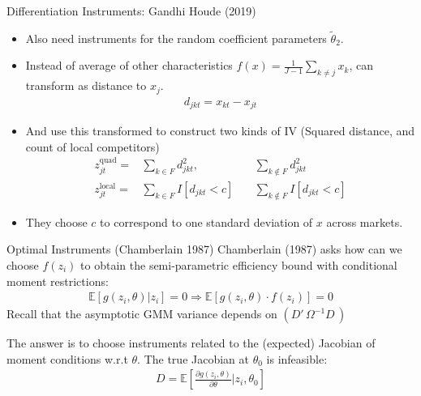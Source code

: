 \documentclass[xcolor=pdftex,dvipsnames,table,mathserif,aspectratio=169]{beamer}
\begin{document}
\begin{frame}{Differentiation Instruments: Gandhi Houde (2019)}
\small
\begin{itemize}
\item Also need instruments for the random coefficient parameters $\widetilde{\theta}_2$.
\item Instead of average of other characteristics $f(x) = \frac{1}{J-1} \sum_{k \neq j} x_k$, can transform as distance to $x_j$.
\begin{eqnarray*}
d_{jkt} =  x_{kt} - x_{jt}  
\end{eqnarray*}
\item And use this transformed to construct two kinds of IV (Squared distance, and count of local competitors)
\begin{eqnarray*}
z_{jt}^{\text{quad}} =& \sum_{k  \in F}  d_{jkt}^2,  \quad &\sum_{k \notin F}  d_{jkt}^2 \\
z_{jt}^{\text{local}} =& \sum_{k \in F}  I[d_{jkt} < c]   \quad &\sum_{k \notin F}   I[d_{jkt} < c]
\end{eqnarray*}
\item They choose $c$ to correspond to one standard deviation of $x$ across markets.
\end{itemize}
\end{frame}




\begin{frame}{Optimal Instruments (Chamberlain 1987)}
Chamberlain (1987) asks how can we choose $f(z_i)$ to obtain the semi-parametric efficiency bound with conditional moment restrictions:
\begin{align*}
\mathbb{E}[g(z_i,\theta) | z_i]=0 \Rightarrow \mathbb{E}[g(z_i,\theta) \cdot f(z_i) ]=0 
\end{align*}
Recall that the asymptotic GMM variance depends on $(D'\, \Omega^{-1} D\,)$

The answer is to choose instruments related to the (expected) Jacobian of moment conditions w.r.t $\theta$. The true Jacobian at $\theta_0$ is \alert{infeasible}:
\begin{align*}
D=\mathbb{E}\left[\frac{\partial g(z_i,\theta)}{\partial \theta} | z_i, \theta_0 \right]
\end{align*}
\end{frame}
\end{document}

